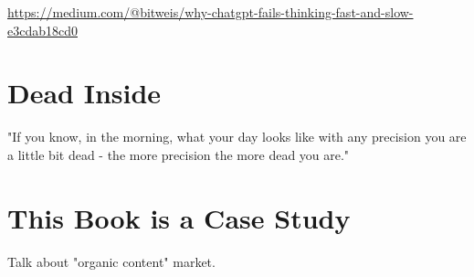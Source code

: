 \url{https://medium.com/@bitweis/why-chatgpt-fails-thinking-fast-and-slow-e3cdab18cd0}

\section{Dead Inside}

"If you know, in the morning, what your day looks like with any precision you are a little bit dead - the more precision the more dead you are."

\section{This Book is a Case Study}

Talk about "organic content" market.
